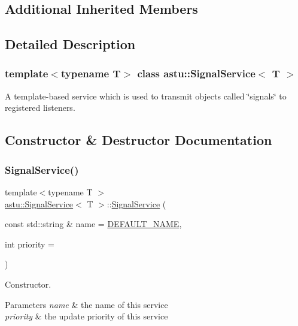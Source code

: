 \subsection*{Additional Inherited Members}


\subsection{Detailed Description}
\subsubsection*{template$<$typename T$>$\newline
class astu\+::\+Signal\+Service$<$ T $>$}

A template-\/based service which is used to transmit objects called \char`\"{}signals\char`\"{} to registered listeners. 

\subsection{Constructor \& Destructor Documentation}
\mbox{\label{classastu_1_1SignalService_acf4e3bfbacc9eb6654a84d59b3ff1a6a}} 
\subsubsection{\texorpdfstring{Signal\+Service()}{SignalService()}}
{\footnotesize\ttfamily template$<$typename T $>$ \\
\hyperlink{classastu_1_1SignalService}{astu\+::\+Signal\+Service}$<$ T $>$\+::\hyperlink{classastu_1_1SignalService}{Signal\+Service} (\begin{DoxyParamCaption}\item[{const std\+::string \&}]{name = {\ttfamily \hyperlink{classastu_1_1BaseService_a9483b26ad631bd14646ef2d2170cd828}{D\+E\+F\+A\+U\+L\+T\+\_\+\+N\+A\+ME}},  }\item[{int}]{priority = {} }\end{DoxyParamCaption})\hspace{0.3cm}{\ttfamily [inline]}}

Constructor.


\begin{DoxyParams}{Parameters}
{\em name} & the name of this service \\
\hline
{\em priority} & the update priority of this service \\
\hline
\end{DoxyParams}



